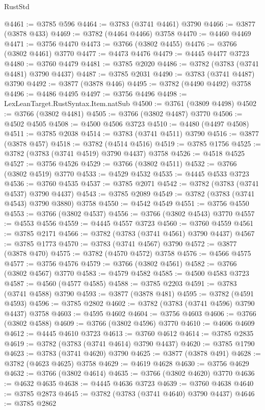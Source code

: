 \begin{lexlean}{RustStd}
\begin{coremodule}
@4461 := @3785 @596
@4464 := @3783 (@3741 @4461) @3790
@4466 := @3877 (@3878 @433)
@4469 := @3782 (@4464 @4466) @3758
@4470 := @4460 @4469
@4471 := @3756 @4470
@4473 := @3766 (@3802 @4455)
@4476 := @3766 (@3802 @4461) @3770
@4477 := @4473 @4476
@4479 := @4445 @4477 @3723
@4480 := @3760 @4479
@4481 := @3785 @2020
@4486 := @3782 (@3783 (@3741 @4481) @3790 @4437)
@4487 := @3785 @2031
@4490 := @3783 (@3741 @4487) @3790
@4492 := @3877 (@3878 @446)
@4495 := @3782 (@4490 @4492) @3758
@4496 := @4486 @4495
@4497 := @3756 @4496
@4498 := LexLeanTarget.RustSyntax.Item.natSub
@4500 := @3761 (@3809 @4498)
@4502 := @3766 (@3802 @4481)
@4505 := @3766 (@3802 @4487) @3770
@4506 := @4502 @4505
@4508 := @4500 @4506 @3723
@4510 := @4480 (@4497 @4508)
@4511 := @3785 @2038
@4514 := @3783 (@3741 @4511) @3790
@4516 := @3877 (@3878 @457)
@4518 := @3782 (@4514 @4516)
@4519 := @3785 @1756
@4525 := @3782 (@3783 (@3741 @4519) @3790 @4437) @3758
@4526 := @4518 @4525
@4527 := @3756 @4526
@4529 := @3766 (@3802 @4511)
@4532 := @3766 (@3802 @4519) @3770
@4533 := @4529 @4532
@4535 := @4445 @4533 @3723
@4536 := @3760 @4535
@4537 := @3785 @2071
@4542 := @3782 (@3783 (@3741 @4537) @3790 @4437)
@4543 := @3785 @2089
@4549 := @3782 (@3783 (@3741 @4543) @3790 @3880) @3758
@4550 := @4542 @4549
@4551 := @3756 @4550
@4553 := @3766 (@3802 @4537)
@4556 := @3766 (@3802 @4543) @3770
@4557 := @4553 @4556
@4559 := @4445 @4557 @3723
@4560 := @3760 @4559
@4561 := @3785 @2171
@4566 := @3782 (@3783 (@3741 @4561) @3790 @4437)
@4567 := @3785 @1773
@4570 := @3783 (@3741 @4567) @3790
@4572 := @3877 (@3878 @470)
@4575 := @3782 (@4570 @4572) @3758
@4576 := @4566 @4575
@4577 := @3756 @4576
@4579 := @3766 (@3802 @4561)
@4582 := @3766 (@3802 @4567) @3770
@4583 := @4579 @4582
@4585 := @4500 @4583 @3723
@4587 := @4560 (@4577 @4585)
@4588 := @3785 @2203
@4591 := @3783 (@3741 @4588) @3790
@4593 := @3877 (@3878 @481)
@4595 := @3782 (@4591 @4593)
@4596 := @3785 @2802
@4602 := @3782 (@3783 (@3741 @4596) @3790 @4437) @3758
@4603 := @4595 @4602
@4604 := @3756 @4603
@4606 := @3766 (@3802 @4588)
@4609 := @3766 (@3802 @4596) @3770
@4610 := @4606 @4609
@4612 := @4445 @4610 @3723
@4613 := @3760 @4612
@4614 := @3785 @2835
@4619 := @3782 (@3783 (@3741 @4614) @3790 @4437)
@4620 := @3785 @1790
@4623 := @3783 (@3741 @4620) @3790
@4625 := @3877 (@3878 @491)
@4628 := @3782 (@4623 @4625) @3758
@4629 := @4619 @4628
@4630 := @3756 @4629
@4632 := @3766 (@3802 @4614)
@4635 := @3766 (@3802 @4620) @3770
@4636 := @4632 @4635
@4638 := @4445 @4636 @3723
@4639 := @3760 @4638
@4640 := @3785 @2873
@4645 := @3782 (@3783 (@3741 @4640) @3790 @4437)
@4646 := @3785 @2862

\end{coremodule}
\end{lexlean}
